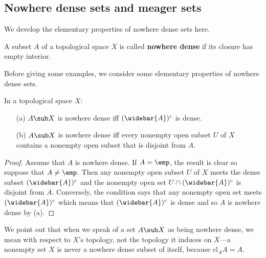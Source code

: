\subsection{Nowhere dense sets and meager sets}
We develop the elementary properties of nowhere dense sets here.
\begin{definition}
A subset $A$ of a topological space $X$ is called \textbf{nowhere dense} if its closure has empty interior.
\end{definition}
Before giving some examples, we consider some elementary properties of nowhere dense sets.
\begin{proposition}\label{nowhere dense iff}
In a topological space $X$:
\begin{itemize}
\item[(a)] $A\sub X$ is nowhere dense iff $(\widebar{A})^c$ is dense.
\item[(b)] $A\sub X$ is nowhere dense iff every nonempty open subset $U$ of $X$ contains a nonempty open subset that is disjoint from $A$.
\end{itemize}
\end{proposition}
\begin{proof}
Assume that $A$ is nowhere dense. If $A=\emp$, the result is clear so suppose that $A\neq\emp$. Then any nonempty open subset $U$ of $X$ meets the dense subset $(\widebar{A})^c$ and the nonempty open set $U\cap(\widebar{A})^c$ is disjoint from $A$. Conversely, the condition says that any nonempty open set meets $(\widebar{A})^c$ which means that $(\widebar{A})^c$ is dense and so $A$ is nowhere dense by (a).
\end{proof}
We point out that when we speak of a set $A\sub X$ as being nowhere dense, we mean with respect to $X$'s topology, not the topology it induces on $X$---a nonempty set $X$ is never a nowhere dense subset of itself, because $\mathrm{cl}_AA=A$.
